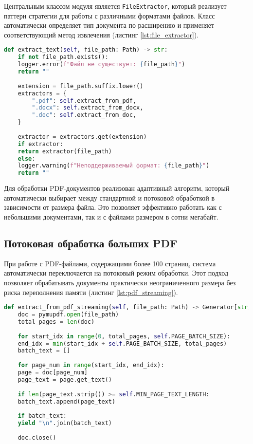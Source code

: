 Центральным классом модуля является \texttt{FileExtractor}, который реализует паттерн стратегии для работы с различными форматами файлов. Класс автоматически определяет тип документа по расширению и применяет соответствующий метод извлечения (листинг \ref{lst:file_extractor}).
\clearpage

\begin{lstlisting}[language=Python,caption={Универсальный метод извлечения текста},label=lst:file_extractor]
	def extract_text(self, file_path: Path) -> str:
	if not file_path.exists():
	logger.error(f"Файл не существует: {file_path}")
	return ""
	
	extension = file_path.suffix.lower()
	extractors = {
		".pdf": self.extract_from_pdf,
		".docx": self.extract_from_docx,
		".doc": self.extract_from_doc,
	}
	
	extractor = extractors.get(extension)
	if extractor:
	return extractor(file_path)
	else:
	logger.warning(f"Неподдерживаемый формат: {file_path}")
	return ""
\end{lstlisting}

Для обработки PDF-документов реализован адаптивный алгоритм, который автоматически выбирает между стандартной и потоковой обработкой в зависимости от размера файла. Это позволяет эффективно работать как с небольшими документами, так и с файлами размером в сотни мегабайт.

\subsection{Потоковая обработка больших PDF}

При работе с PDF-файлами, содержащими более 100 страниц, система автоматически переключается на потоковый режим обработки. Этот подход позволяет обрабатывать документы практически неограниченного размера без риска переполнения памяти (листинг \ref{lst:pdf_streaming}).
\clearpage

\begin{lstlisting}[language=Python,caption={Потоковая обработка больших PDF-файлов},label=lst:pdf_streaming]
	def extract_from_pdf_streaming(self, file_path: Path) -> Generator[str, None, None]:
	doc = pymupdf.open(file_path)
	total_pages = len(doc)
	
	for start_idx in range(0, total_pages, self.PAGE_BATCH_SIZE):
	end_idx = min(start_idx + self.PAGE_BATCH_SIZE, total_pages)
	batch_text = []
	
	for page_num in range(start_idx, end_idx):
	page = doc[page_num]
	page_text = page.get_text()
	
	if len(page_text.strip()) >= self.MIN_PAGE_TEXT_LENGTH:
	batch_text.append(page_text)
	
	if batch_text:
	yield "\n".join(batch_text)
	
	doc.close()
\end{lstlisting}

